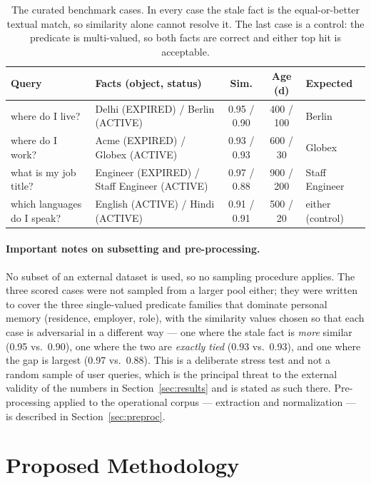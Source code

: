 \documentclass[11pt,a4paper]{article}
\begin{document}
\begin{table}[htbp]
\centering
\caption{The curated benchmark cases. In every case the stale fact is the
equal-or-better textual match, so similarity alone cannot resolve it. The last
case is a control: the predicate is multi-valued, so both facts are correct and
either top hit is acceptable.}
\label{tab:cases}
\small
\begin{tabularx}{\textwidth}{p{3.4cm} p{4.6cm} c c X}
\toprule
\textbf{Query} & \textbf{Facts (object, status)} & \textbf{Sim.} & \textbf{Age (d)} & \textbf{Expected}\\
\midrule
where do I live? & Delhi (EXPIRED) / Berlin (ACTIVE) & 0.95 / 0.90 & 400 / 100 & Berlin\\
where do I work? & Acme (EXPIRED) / Globex (ACTIVE) & 0.93 / 0.93 & 600 / 30 & Globex\\
what is my job title? & Engineer (EXPIRED) / Staff Engineer (ACTIVE) & 0.97 / 0.88 & 900 / 200 & Staff Engineer\\
which languages do I speak? & English (ACTIVE) / Hindi (ACTIVE) & 0.91 / 0.91 & 500 / 20 & either (control)\\
\bottomrule
\end{tabularx}
\end{table}

\paragraph{Important notes on subsetting and pre-processing.} No subset of an
external dataset is used, so no sampling procedure applies. The three scored
cases were not sampled from a larger pool either; they were written to cover
the three single-valued predicate families that dominate personal memory
(residence, employer, role), with the similarity values chosen so that each
case is adversarial in a different way --- one where the stale fact is
\emph{more} similar (0.95 vs.\ 0.90), one where the two are \emph{exactly tied}
(0.93 vs.\ 0.93), and one where the gap is largest (0.97 vs.\ 0.88). This is a
deliberate stress test and not a random sample of user queries, which is the
principal threat to the external validity of the numbers in
Section~\ref{sec:results} and is stated as such there. Pre-processing applied to
the operational corpus --- extraction and normalization --- is described in
Section~\ref{sec:preproc}.

\section{Proposed Methodology}
\label{sec:method}
\end{document}
